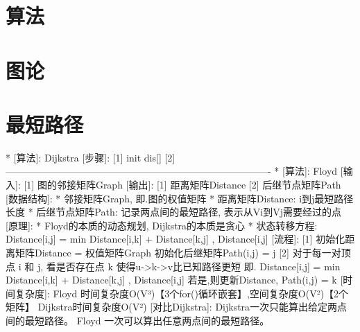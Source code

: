 \section{算法}
    \section{图论}

        \section{最短路径}
        *	[算法]: Dijkstra
                [步骤]:
                    [1] init dis[]
                    [2] 
        ----------------------------------------------------------------------------------
        *	[算法]: Floyd
                [输入]:	[1] 图的邻接矩阵Graph
                [输出]: [1] 距离矩阵Distance	[2] 后继节点矩阵Path
                [数据结构]:
                    * 邻接矩阵Graph, 即.图的权值矩阵
                    * 距离矩阵Distance: i到j最短路径长度
                    * 后继节点矩阵Path: 记录两点间的最短路径, 表示从Vi到Vj需要经过的点
                [原理]:
                    * Floyd的本质的动态规划, Dijkstra的本质是贪心
                    * 状态转移方程:
                        Distance[i,j] = min{ Distance[i,k] + Distance[k,j] , Distance[i,j] }
                [流程]:
                    [1] 初始化距离矩阵Distance = 权值矩阵Graph
                        初始化后继矩阵Path(i,j) = j
                    [2] 对于每一对顶点 i 和 j, 看是否存在点 k 使得u->k->v比已知路径更短
                            即. Distance[i,j] = min{ Distance[i,k] + Distance[k,j] , Distance[i,j] }
                        若是,则更新Distance, Path(i,j) = k
                [时间复杂度]:
                    Floyd	时间复杂度O(V³)【3个for()循环嵌套】,空间复杂度O(V²)【2个矩阵】
                    Dijkstra时间复杂度O(V²)
                [对比Dijkstra]:
                    Dijkstra一次只能算出给定两点间的最短路径。
                    Floyd   一次可以算出任意两点间的最短路径。


